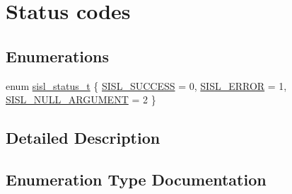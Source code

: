 \hypertarget{group__status}{}\section{Status codes}
\label{group__status}
\subsection*{Enumerations}
\begin{DoxyCompactItemize}
\item 
enum \hyperlink{group__status_ga82c112a16803c9ddebc065a1b0f16287}{sisl\+\_\+status\+\_\+t} \{ \hyperlink{group__status_gga82c112a16803c9ddebc065a1b0f16287a60b9f04752a2c4dd6214f8a4fd7d913b}{S\+I\+S\+L\+\_\+\+S\+U\+C\+C\+E\+S\+S} = 0, 
\hyperlink{group__status_gga82c112a16803c9ddebc065a1b0f16287a333a15fde6c5ab88e3f7448240815f5a}{S\+I\+S\+L\+\_\+\+E\+R\+R\+O\+R} = 1, 
\hyperlink{group__status_gga82c112a16803c9ddebc065a1b0f16287a68c2b945ac9193d3b47b0cc0e6fb38d3}{S\+I\+S\+L\+\_\+\+N\+U\+L\+L\+\_\+\+A\+R\+G\+U\+M\+E\+N\+T} = 2
 \}
\end{DoxyCompactItemize}


\subsection{Detailed Description}


\subsection{Enumeration Type Documentation}
\hypertarget{group__status_ga82c112a16803c9ddebc065a1b0f16287}{}

